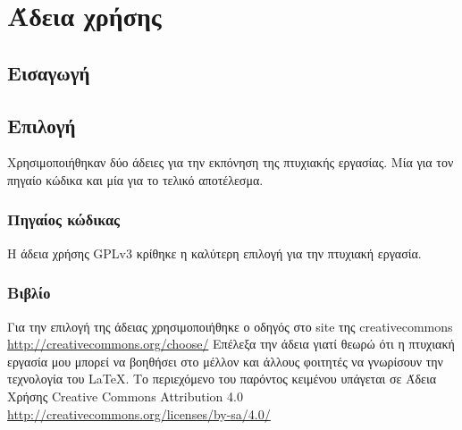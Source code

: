 %	
%	

\chapter{Άδεια χρήσης}
\section{Εισαγωγή}



\section{Επιλογή}
Χρησιμοποιήθηκαν δύο άδειες για την εκπόνηση της πτυχιακής εργασίας. Μία για τον πηγαίο κώδικα και μία για το τελικό αποτέλεσμα.
\subsection{Πηγαίος κώδικας}
Η άδεια χρήσης GPLv3 κρίθηκε η καλύτερη επιλογή για την πτυχιακή εργασία. 

\subsection{Βιβλίο}
Για την επιλογή της άδειας χρησιμοποιήθηκε ο οδηγός στο site της creativecommons \url{http://creativecommons.org/choose/}
Επέλεξα την άδεια \ccbysa γιατί θεωρώ ότι η πτυχιακή εργασία μου μπορεί να βοηθήσει στο μέλλον και άλλους φοιτητές να γνωρίσουν την τεχνολογία του \LaTeX. 
\vfill
Το περιεχόμενο του παρόντος κειμένου υπάγεται σε Άδεια Χρήσης Creative Commons Attribution 4.0 \url{http://creativecommons.org/licenses/by-sa/4.0/}